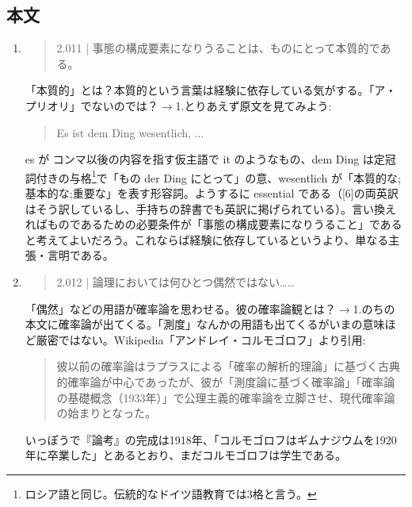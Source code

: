 \documentclass[11pt,a4paper]{jsbook}
\begin{document}
\subsection{本文}\label{zenkadai2}
\begin{enumerate}
\item
\begin{quote}
2.011 | 事態の構成要素になりうることは、ものにとって本質的である。
\end{quote}
「本質的」とは？本質的という言葉は経験に依存している気がする。「ア・プリオリ」でないのでは？$\rightarrow$1.とりあえず原文を見てみよう:
\begin{quote}
Es ist dem Ding wesentlich, ...
\end{quote}
es が コンマ以後の内容を指す仮主語で it のようなもの、dem Ding は定冠詞付きの与格\footnote{ロシア語と同じ。伝統的なドイツ語教育では3格と言う。}で「もの der Ding にとって」の意、wesentlich が「本質的な;基本的な;重要な」を表す形容詞。ようするに essential である（[6]の両英訳はそう訳しているし、手持ちの辞書でも英訳に掲げられている）。言い換えればものであるための必要条件が「事態の構成要素になりうること」であると考えてよいだろう。これならば経験に依存しているというより、単なる主張・言明である。

\item
\begin{quote}
2.012 | 論理においては何ひとつ偶然ではない……
\end{quote}
「偶然」などの用語が確率論を思わせる。彼の確率論観とは？$\rightarrow$1.のちの本文に確率論が出てくる。「測度」なんかの用語も出てくるがいまの意味ほど厳密ではない。Wikipedia「アンドレイ・コルモゴロフ」より引用:
\begin{quote}彼以前の確率論はラプラスによる「確率の解析的理論」に基づく古典的確率論が中心であったが、彼が「測度論に基づく確率論」「確率論の基礎概念（1933年）」で公理主義的確率論を立脚させ、現代確率論の始まりとなった。
\end{quote}
いっぽうで『論考』の完成は1918年、「コルモゴロフはギムナジウムを1920年に卒業した」とあるとおり、まだコルモゴロフは学生である。



\end{enumerate}
\end{document}
